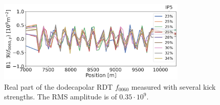 \section{}

\begin{figure}[!htb]
    \centering
    \includegraphics[width=0.8\textwidth]{./images/f0060y_all_meas_real.pdf}
    \caption{Real part of the dodecapolar RDT $f_{0060}$ measured with several kick strengths. The
    RMS amplitude is of $0.35\cdot10^{9}$.}
    \label{fig:high_orders:chroma_nominal_correction_full_range}
\end{figure}


